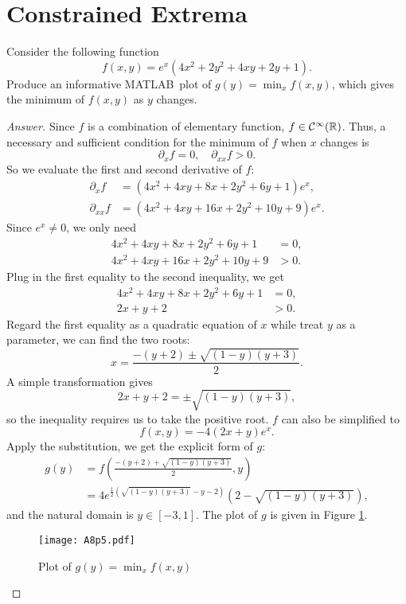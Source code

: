 \section{Constrained Extrema}
Consider the following function
\[ f(x,y) = e^x\left(4x^2 + 2y^2 + 4xy + 2y + 1\right). \]
Produce an informative MATLAB\texttrademark\ plot of \(g(y) = \min_{x} f(x, y)\), which gives the minimum of \(f(x,y)\) as \(y\) changes.
\begin{proof}[Answer]
	Since \(f\) is a combination of elementary function, \(f\in\mathcal{C}^\infty(\mathbb{R})\).
	Thus, a necessary and sufficient condition for the minimum of \(f\) when \(x\) changes is
	\[ \partial_x f=0, \quad \partial_{xx}f>0. \]
	So we evaluate the first and second derivative of \(f\):
	\begin{align*}
	\partial_x f&=\left(4 x^2+4 x y+8 x+2 y^2+6 y+1\right)e^x, \\
	\partial_{xx} f&=\left(4 x^2+4 x y+16 x+2 y^2+10 y+9\right)e^x.
	\end{align*}
	Since \(e^x\neq0\), we only need
	\begin{align*}
	4 x^2+4 x y+8 x+2 y^2+6 y+1&=0, \\
	4 x^2+4 x y+16 x+2 y^2+10 y+9&>0.
	\end{align*}
	Plug in the first equality to the second inequality, we get
	\begin{align*}
	4 x^2+4 x y+8 x+2 y^2+6 y+1&=0, \\
	2 x+ y+ 2&>0.
	\end{align*}
	Regard the first equality as a quadratic equation of \(x\) while treat \(y\) as a parameter, we can find the two roots:
	\[ x=\frac{-(y+2)\pm\sqrt{(1-y)(y+3)}}{2}. \]
	A simple transformation gives
	\[ 2x+y+2=\pm\sqrt{(1-y)(y+3)}, \]
	so the inequality requires us to take the positive root.
	\(f\) can also be simplified to
	\[ f(x,y)= -4(2x+y) e^x. \]
	Apply the substitution, we get the explicit form of \(g\):
	\begin{align*}
	 g(y)&=f\left(\frac{-(y+2)+\sqrt{(1-y)(y+3)}}{2}, y\right)\\
	 &=4 e^{\frac{1}{2} \left(\sqrt{(1-y) (y+3)}-y-2\right)} \left(2-\sqrt{(1-y) (y+3)}\right),
	\end{align*}
	and the natural domain is \(y\in[-3,1]\).
	The plot of \(g\) is given in Figure \ref{mathematica}.
	\begin{figure}[htbp]
		\centering
		\texttt{[image: A8p5.pdf]}
		\caption{Plot of \(g(y) = \min_{x} f(x, y)\)}
		\label{mathematica}
	\end{figure}
\end{proof}